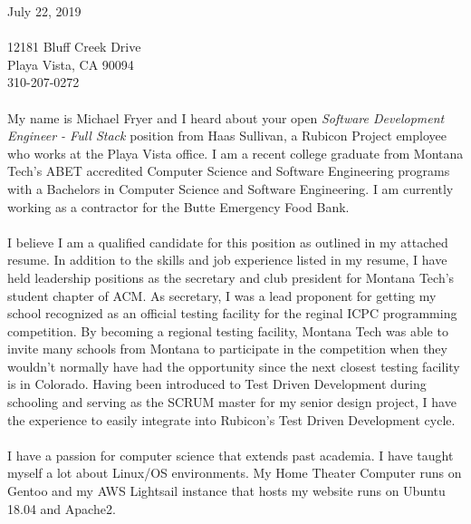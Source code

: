 July 22, 2019\\
\mbox{}\\
12181 Bluff Creek Drive\\
Playa Vista, CA 90094\\
310-207-0272\\

\paragraph{}
My name is Michael Fryer and I heard about your open \textit{Software Development Engineer - Full Stack} position from Haas Sullivan, a Rubicon Project employee who works at the Playa Vista office. I am a recent college graduate from Montana Tech's ABET accredited Computer Science and Software Engineering programs with a Bachelors in Computer Science and Software Engineering. I am currently working as a contractor for the Butte Emergency Food Bank.

\paragraph{}
I believe I am a qualified candidate for this position as outlined in my attached resume. In addition to the skills and job experience listed in my resume, I have held leadership positions as the secretary and club president for Montana Tech's student chapter of ACM. As secretary, I was a lead proponent for getting my school recognized as an official testing facility for the reginal ICPC programming competition. By becoming a regional testing facility, Montana Tech was able to invite many schools from Montana to participate in the competition when they wouldn't normally have had the opportunity since the next closest testing facility is in Colorado. Having been introduced to Test Driven Development during schooling and serving as the SCRUM master for my senior design project, I have the experience to easily integrate into Rubicon's Test Driven Development cycle.

\paragraph{}
I have a passion for computer science that extends past academia. I have taught myself a lot about Linux/OS environments. My Home Theater Computer runs on Gentoo and my AWS Lightsail instance that hosts my website runs on Ubuntu 18.04 and Apache2.